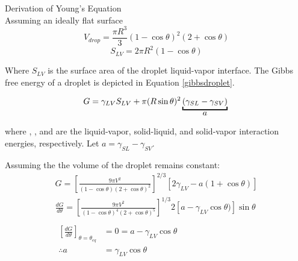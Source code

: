 
Derivation of Young's Equation\\
Assuming an ideally flat surface
\begin{equation} \label{dropvol}
V_{drop} = \frac{\pi R^{3}}{3} (1-\cos\theta)^{2} (2+\cos\theta)
\end{equation}
\begin{equation} \label{liqvapSA}
S_{LV} = 2\pi R^{2} (1-\cos\theta)
\end{equation}

Where $S_{LV}$ is the surface area of the droplet liquid-vapor interface. The Gibbs free energy of a droplet is depicted in Equation \ref{gibbsdroplet}.

\begin{equation} \label{gibbsdroplet}
G = \gamma_{LV} S_{LV} + \pi(R \sin\theta)^{2} \underbracket{(\gamma_{SL}-\gamma_{SV})}_{\text{\normalsize{$a$}}}\\
\end{equation}

where \gamLV, \gamSL, and \gamSV are the liquid-vapor, solid-liquid, and solid-vapor interaction energies, respectively. Let $a = \gamma_{SL}-\gamma_{SV}$. 

Assuming the the volume of the droplet remains constant:
\begin{equation*}
	\begin{gathered}
		G = \left[\frac{9\pi V^{2}}{(1-\cos\theta)(2+\cos\theta)^{2}}\right]^{2/3}
		\left[2\gamma_{LV} - a(1+\cos\theta)\right]\\
		\frac{dG}{d\theta} = \left[\frac{9\pi V^{2}}{(1-\cos\theta)^{4}(2+\cos\theta)^{5}}\right]^{1/3}
		2\left[a-\gamma_{LV}\cos\theta)\right]\sin\theta\\ \\
		\begin{split}
			\left[\frac{dG}{d\theta}\right]_{\theta=\theta_{eq}}&=0=a-\gamma_{LV}\cos\theta\\
			\therefore a 	&= \gamma_{LV}\cos\theta\\
		\end{split}					
	\end{gathered}
\end{equation*}